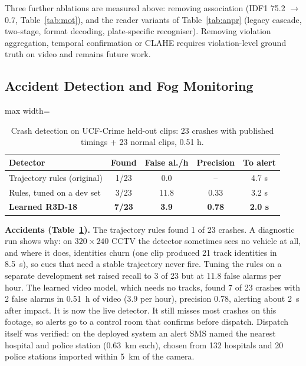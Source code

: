\documentclass[10pt,a4paper,twocolumn]{article}
\begin{document}
Three further ablations are measured above: removing association (IDF1 75.2 $\rightarrow$ 0.7, Table~\ref{tab:mot}), and the
reader variants of Table~\ref{tab:anpr} (legacy cascade, two-stage, format decoding, plate-specific recogniser). Removing violation
aggregation, temporal confirmation or CLAHE requires violation-level ground truth on video and remains future work.

\subsection{Accident Detection and Fog Monitoring}
\begin{table}[t]
\centering\scriptsize
\caption{Crash detection on UCF-Crime held-out clips: 23 crashes with published timings + 23 normal clips, 0.51 h.}\label{tab:acc}
\setlength{\tabcolsep}{2.4pt}
\begin{adjustbox}{max width=\columnwidth}
\begin{tabular}{@{}lcccc@{}}
\toprule
Detector & Found & False al./h & Precision & To alert\\
\midrule
Trajectory rules (original) & 1/23 & 0.0 & -- & 4.7 s\\
Rules, tuned on a dev set & 3/23 & 11.8 & 0.33 & 3.2 s\\
\textbf{Learned R3D-18} & \textbf{7/23} & \textbf{3.9} & \textbf{0.78} & \textbf{2.0 s}\\
\bottomrule
\end{tabular}
\end{adjustbox}
\end{table}

\textbf{Accidents (Table~\ref{tab:acc}).} The trajectory rules found 1 of 23 crashes. A diagnostic run shows why: on
$320\times240$ CCTV the detector sometimes sees no vehicle at all, and where it does, identities churn (one clip
produced 21 track identities in 8.5~s), so cues that need a stable trajectory never fire. Tuning the rules on a
separate development set raised recall to 3 of 23 but at 11.8 false alarms per hour. The learned video model, which
needs no tracks, found 7 of 23 crashes with 2 false alarms in 0.51~h of video (3.9 per hour), precision 0.78, alerting
about 2~s after impact. It is now the live detector. It still misses most crashes on this footage, so alerts go to a
control room that confirms before dispatch. Dispatch itself was verified: on the deployed system an alert SMS named the
nearest hospital and police station (0.63~km each), chosen from 132 hospitals and 20 police stations imported within
5~km of the camera.
\end{document}
